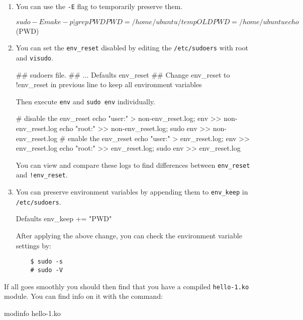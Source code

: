 \documentclass[10pt, oneside]{book}
\begin{document}
\begin{enumerate}
  \item {
  You can use the \verb|-E| flag to temporarily preserve them.
  
  \begin{codebash}
    $ sudo -E make -p | grep PWD
    PWD = /home/ubuntu/temp
    OLDPWD = /home/ubuntu
    echo $(PWD)
  \end{codebash}
  }

  \item {
  You can set the \verb|env_reset| disabled by editing the \verb|/etc/sudoers| with root and \verb|visudo|. 

  \begin{code}
  ## sudoers file.
  ## 
  ...
  Defaults env_reset
  ## Change env_reset to !env_reset in previous line to keep all environment variables
  \end{code}

  Then execute \verb|env| and \verb|sudo env| individually.

  \begin{codebash}
    # disable the env_reset
    echo "user:" > non-env_reset.log; env >> non-env_reset.log
    echo "root:" >> non-env_reset.log; sudo env >> non-env_reset.log
    # enable the env_reset
    echo "user:" > env_reset.log; env >> env_reset.log
    echo "root:" >> env_reset.log; sudo env >> env_reset.log
  \end{codebash}

  You can view and compare these logs to find differences between \verb|env_reset| and \verb|!env_reset|. 
  }

  \item {You can preserve environment variables by appending them to \verb|env_keep| in \verb|/etc/sudoers|. 
  
  \begin{code}
  Defaults env_keep += "PWD"
  \end{code}

  After applying the above change, you can check the environment variable settings by:

  \begin{verbatim}
    $ sudo -s
    # sudo -V
  \end{verbatim}
  }
\end{enumerate}

If all goes smoothly you should then find that you have a compiled \verb|hello-1.ko| module.
You can find info on it with the command:
\begin{codebash}
modinfo hello-1.ko
\end{codebash}
\end{document}
